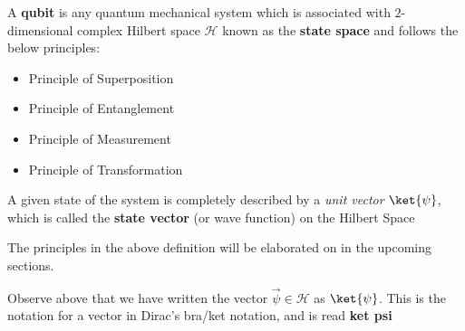 \begin{samepage}
\begin{defn}
A \textbf{qubit} is any quantum mechanical system which is associated with $2$-dimensional complex Hilbert space $\mathcal{H}$ known as the \textbf{state space} and follows the below principles:
\begin{itemize}
    \item Principle of Superposition
    \item Principle of Entanglement
    \item Principle of Measurement
    \item Principle of Transformation
\end{itemize}
 A given state of the system is completely described by a
 \textit{unit vector} $\ket{\psi}$, which is called the \textbf{state vector} (or wave function) on the Hilbert Space
\end{defn}

The principles in the above definition will be elaborated on in the upcoming sections.

\end{samepage}

\begin{notation}
    Observe above that we have written the vector $\vec{\psi} \in \mathcal{H}$ as $\ket{\psi}$. This is the notation for a vector in \textnormal{Dirac's bra/ket notation}, and is read \textbf{ket psi}
\end{notation}
